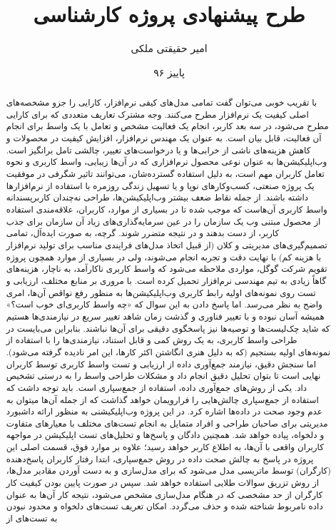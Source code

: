 \documentclass{article}
\title{طرح پیشنهادی پروژه کارشناسی}
\author{امیر حقیقتی ملکی}
\date{پاییز ۹۶}
\theoremstyle{definition}
\begin{document}
	\begin{titlepage}
		
		
	\end{titlepage}
	\newpage
	\begin{abstract}
		\thispagestyle{plain}
	با تقریب خوبی می‌توان گفت تمامی مدل‌های کیفی نرم‌افزار، کارایی را جزو مشخصه‌های اصلی کیفیت یک نرم‌افزار مطرح می‌کنند. وجه مشترک تعاریف متعددی که برای کارایی مطرح می‌شود، در سه بعد کاربر، انجام یک فعالیت مشخص و تعامل با یک واسط برای انجام آن فعالیت، قابل بیان است. به عنوان یک مهندس نرم‌افزار، افزایش کیفیت در محصولات و کاهش هزینه‌های ناشی از خرابی‌ها و یا درخواست‌های تغییر، چالشی تامل برانگیز است. وب‌اپلیکیشن‌ها به عنوان نوعی محصول نرم‌افزاری که در آن‌ها زیبایی، واسط کاربری و نحوه تعامل کاربران مهم است، به دلیل استفاده گسترده‌شان، می‌توانند تاثیر شگرفی در موفقیت یک پروژه صنعتی، کسب‌وکارهای نوپا و یا تسهیل زندگی روزمره با استفاده از نرم‌افزارها داشته باشند. از جمله نقاط ضعف بیشتر وب‌اپلیکیشن‌ها، طراحی نه‌چندان کاربرپسندانه واسط کاربری آن‌هاست که موجب شده تا در بسیاری از موارد، کاربران، علاقه‌مندی استفاده از محصول مبتنی وب یک سازمان را در عین سرمایه‌گذاری‌های زیاد آن سازمان برای جذب کاربر، از دست بدهند و در نتیجه متضرر شوند. گرچه، به صورت ایده‌آل، تمامی تصمیم‌گیری‌های مدیریتی و کلان (از قبیل اتخاذ مدل‌های فرایندی مناسب برای تولید نرم‌افزار با هزینه کم) با نهایت دقت و تجربه انجام می‌شوند، ولی در بسیاری از موارد همچون پروژه تقویم شرکت گوگل، مواردی ملاحظه می‌شود که واسط کاربری ناکارآمد، به ناچار، هزینه‌های گاهاً زیادی به تیم مهندسی نرم‌افزار تحمیل کرده است. با مروری بر منابع مختلف، ارزیابی و تست روی نمونه‌های اولیه رابط کاربری وب‌اپلیکیشن‌ها به منظور رفع نواقص آن‌ها، امری واضح به نظر می‌رسد. اما پاسخ دادن به این سوال که «چه واسط کاربری‌ای خوب است؟» همیشه آسان نبوده و با تغییر فناوری و گذشت زمان شاهد تغییر سریع در نیازمندی‌ها هستیم که شاید چک‌لیست‌ها و توصیه‌ها نیز پاسخگوی دقیقی برای آن‌ها نباشند. بنابراین می‌بایست در طراحی واسط کاربری، به یک روش کمی و قابل استناد، نیازمندی‌ها را با استفاده از نمونه‌های اولیه بسنجیم (که به دلیل هنری انگاشتن اکثر کارها، این امر نادیده گرفته می‌شود). اما سنجش دقیق، نیازمند جمع‌آوری داده از ارزیابی و تست واسط کاربری توسط کاربران نهایی است تا بتوان تحلیل دقیق انجام داد و مشکلات طراحی واسط را به درستی تشخیص داد. یکی از روش‌های جمع‌آوری داده، استفاده از جمع‌سپاری است. باید توجه داشت که استفاده از جمع‌سپاری چالش‌هایی را فرارویمان خواهد گذاشت که از جمله آن‌ها میتوان به عدم وجود صحت در داده‌ها اشاره کرد. در این پروژه وب‌اپلیکیشنی به منظور ارائه داشبورد مدیریتی برای صاحبان طراحی و افراد متمایل به انجام تست‌های مختلف با معیارهای متفاوت و دلخواه، پیاده خواهد شد. همچنین دادگان و پاسخ‌ها و تحلیل‌های تست اپلیکیشن در مواجهه کاربران واقعی با آن‌ها، به اطلاع کاربر خواهد رسید؛ علاوه بر موارد فوق، قسمت اصلی این پروژه در پاسخ به چالش صحت داده در روش جمع‌سپاری، ابتدا رفتار کاربران پاسخ‌دهنده (کارگران) توسط ماتریسی مدل می‌شود که برای مدل‌سازی و به دست آوردن مقادیر مدل‌ها، از روش تزریق سوالات طلایی استفاده خواهد شد. سپس در صورت پایین بودن کیفیت کار کارگران از حد مشخصی که در هنگام مدل‌سازی مشخص می‌شود، نتیجه کار آن‌ها به عنوان داده نامربوط شناخته شده و حذف می‌گردد. امکان تعریف تست‌های دلخواه و محدود نبودن به تست‌های از 
\end{abstract}
\end{document}
